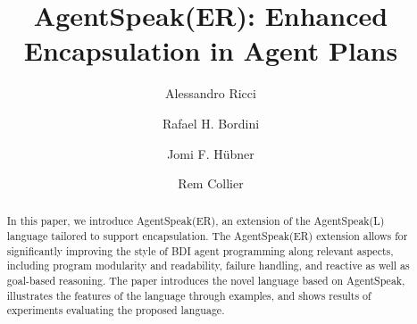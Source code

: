 \documentclass{llncs}
\begin{document}
\title{AgentSpeak(ER): Enhanced Encapsulation in Agent Plans}




\author{Alessandro Ricci \and Rafael H. Bordini \and  Jomi F. H\"ubner \and Rem Collier}


\maketitle

\begin{abstract}  
  In this paper, we introduce AgentSpeak(ER), an extension of the
  AgentSpeak(L) language tailored to support encapsulation. The
  AgentSpeak(ER) extension allows for significantly improving the
  style of BDI agent programming along relevant aspects, including
  program modularity and readability, failure handling, and reactive
  as well as goal-based reasoning. The paper introduces the novel
  language based on AgentSpeak, %
  illustrates the features of the language through
  examples, and shows results of experiments evaluating the proposed
  language.
\end{abstract}








% 








\end{document}
